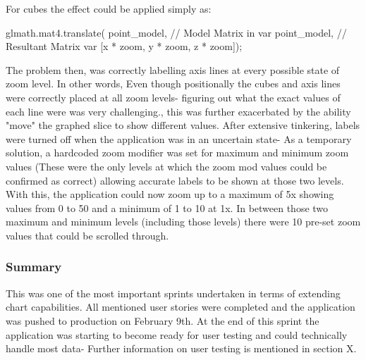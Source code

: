For cubes the effect could be applied simply as:
\begin{code}
    glmath.mat4.translate(
    point_model, // Model Matrix in var
    point_model, // Resultant Matrix var
        [x * zoom, y * zoom, z * zoom]);
\end{code}

The problem then, was correctly labelling axis lines at every possible state of zoom level. In other words, Even though positionally the cubes and axis lines were correctly placed at all zoom levels- figuring out what the exact values of each line were was very challenging., this was further exacerbated by the ability "move" the graphed slice to show different values. After extensive tinkering, labels were turned off when the application was in an uncertain state- As a temporary solution, a hardcoded zoom modifier was set for maximum and minimum zoom values (These were the only levels at which the zoom mod values could be confirmed as correct) allowing accurate labels to be shown at those two levels.
With this, the application could now zoom up to a maximum of 5x showing values from 0 to 50 and a minimum of 1 to 10 at 1x. In between those two maximum and minimum levels (including those levels) there were 10 pre-set zoom values that could be scrolled through.

\subsubsection{Summary}
This was one of the most important sprints undertaken in terms of extending chart capabilities. All mentioned user stories were completed and the application was pushed to production on February 9th. At the end of this sprint the application was starting to become ready for user testing and could technically handle most data- Further information on user testing is mentioned in section X.

